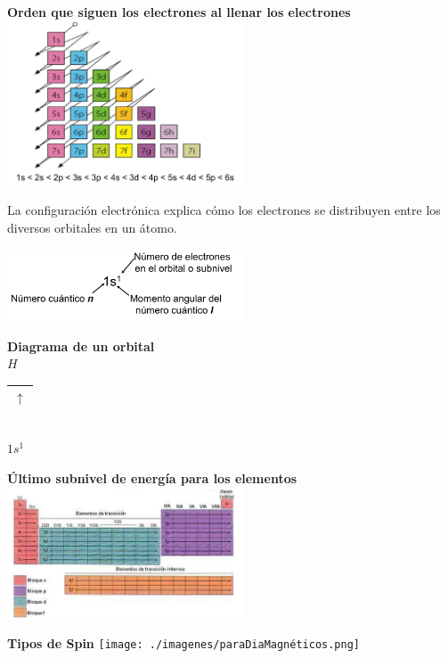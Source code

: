         \begin{center} 
            \textbf{Orden que siguen los electrones al llenar los electrones} \\[5pt]
            \includegraphics[width=7cm]{./imagenes/ordenQueSiguenLosElectronesAlLlenarOrbitales.png}
        \end{center}

        \indent La configuración electrónica explica cómo los electrones se distribuyen entre los diversos orbitales en un átomo.
        \begin{center} \includegraphics[width=7cm]{./imagenes/configuracionElectronica.png} \end{center}

        \begin{center} 
            \textbf{Diagrama de un orbital} \\[10pt] 
            $H$ 
            \begin{tabular}{| c |} 
                \hline 
                $\uparrow$ \\ 
                \hline 
            \end{tabular} \\[4pt] 
            \hspace{4mm} $1s^1$ 
        \end{center}

        \begin{center} \textbf{Último subnivel de energía para los elementos} \\[10pt] \includegraphics[width=7cm]{./imagenes/ultimoSubnivelEnergia.png} \end{center}
        \begin{center} 
            \textbf{Tipos de Spin}
            \texttt{[image: ./imagenes/paraDiaMagnéticos.png]} \\[10pt]
        \end{center}

